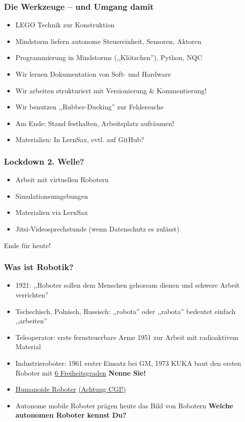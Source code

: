 \documentclass{beamer}
\begin{document}
\begin{frame}
\frametitle{Die Werkzeuge – und Umgang damit}
\begin{itemize}
\item  LEGO Technik zur Konstruktion
\item  Mindstorm liefern autonome Steuereinheit, Sensoren, Aktoren
\item Programmierung in Mindstorms (,,Klötzchen''), Python, NQC
\item  Wir lernen Dokumentation von Soft- und Hardware
\item  Wir arbeiten strukturiert mit Versionierung \& Kommentierung!
\item Wir benutzen ,,Rubber-Ducking'' zur Fehlersuche
\item  Am Ende: Stand festhalten, Arbeitsplatz aufräumen!
\item Materialien: In LernSax, evtl. auf GitHub?
\end{itemize}
\end{frame}

\begin{frame}
\frametitle{Lockdown 2. Welle?}
\begin{itemize}
\item  Arbeit mit virtuellen Robotern 
\item  Simulationsumgebungen 
\item  Materialien via LernSax
\item   Jitsi-Videosprechstunde (wenn Datenschutz es zulässt)
\end{itemize}

Ende für heute!

\end{frame}


\begin{frame}
\frametitle{Was ist Robotik?}
\begin{itemize}
\item 1921: ,,Roboter sollen dem Menschen gehorsam dienen und schwere Arbeit verrichten''
\item Tschechisch, Polnisch, Russisch: ,,robota'' oder ,,rabota'' bedeutet einfach ,,arbeiten'' 
\item Teleoperator: erste fernsteuerbare Arme 1951 zur Arbeit mit radioaktivem Material
\item Industrieroboter: 1961 erster Einsatz bei GM, 1973 KUKA baut den ersten Roboter mit \href{https://www.computerbild.de/artikel/cb-Tests-Handy-So-testet-COMPUTER-BILD-Smartphones-25287581.html}{6 Freiheitsgraden} \textbf{Nenne Sie!}
\item \href{https://www.youtube.com/watch?v=_sBBaNYex3E}{Humanoide Roboter} \href{https://youtu.be/dKjCWfuvYxQ?list=PLByDuMFhvvr77bbMhXFQ73Km0BddpccQN}{(Achtung CGI!)}
\item Autonome mobile Roboter prägen heute das Bild von Robotern \textbf{Welche autonomen Roboter kennst Du?}
\end{itemize}
\end{frame}
\end{document}
